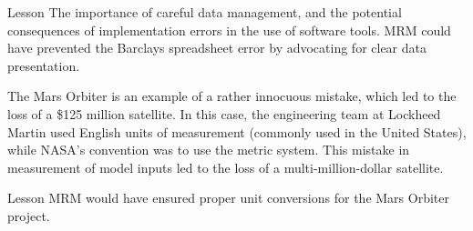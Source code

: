\begin{orexambox}{Lesson}
The importance of careful data management, and the potential consequences of
implementation errors in the use of software tools. MRM could have prevented the
Barclays spreadsheet error by advocating for clear data presentation.
\end{orexambox}


The Mars Orbiter is an example of a rather innocuous mistake, which led to the
loss of a \$125 million satellite. In this case, the engineering team at Lockheed
Martin used English units of measurement (commonly used in the United States),
while NASA's convention was to use the metric system. This mistake in measurement
of model inputs led to the loss of a multi-million-dollar satellite.

\begin{orexambox}{Lesson}
MRM would have ensured proper unit conversions for the Mars Orbiter project.
\end{orexambox}
